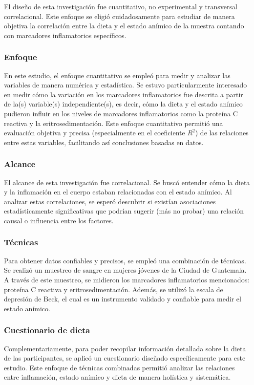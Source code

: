 \documentclass[man]{apa7}
\begin{document}
	El diseño de esta investigación fue cuantitativo, no experimental y
	transversal correlacional. Este enfoque se eligió cuidadosamente para
	estudiar de manera objetiva la correlación entre la dieta y el estado
	anímico de la muestra contando con marcadores inflamatorios
	específicos.\\

	\subsubsection{Enfoque} En este estudio, el enfoque cuantitativo se empleó para
	medir y analizar las variables de manera numérica y estadística. Se
	estuvo particularmente interesado en medir cómo la variación en los
	marcadores inflamatorios fue descrita a partir de la(s) variable(s)
	independiente(s), es decir, cómo la dieta y el estado anímico pudieron
	influir en los niveles de marcadores inflamatorios como la proteína C
	reactiva y la eritrosedimentación. Este enfoque cuantitativo permitió una
	evaluación objetiva y precisa (especialmente en el coeficiente
	\emph{$R^2$}) de las relaciones entre estas variables, facilitando así
	conclusiones basadas en datos.\\

	\subsubsection{Alcance}
	El alcance de esta investigación fue correlacional.
	Se buscó entender cómo la dieta y la inflamación en el cuerpo estaban relacionadas
	con el estado anímico. Al analizar estas correlaciones, se
	esperó descubrir si existían asociaciones estadísticamente significativas
	que podrían sugerir (más no probar) una relación causal o influencia
	entre los factores.

	\subsubsection{Técnicas}
	Para obtener datos confiables y precisos, se empleó una combinación de técnicas. Se realizó un muestreo de sangre en mujeres jóvenes de la Ciudad de Guatemala. A través de este muestreo, se midieron los marcadores inflamatorios mencionados: proteína C reactiva y eritrosedimentación. Además, se utilizó la escala de depresión de Beck, el cual es un instrumento validado y confiable para medir el estado anímico.

	\subsubsection{Cuestionario de dieta}
	Complementariamente, para poder recopilar información detallada sobre la dieta de las participantes, se aplicó un cuestionario diseñado específicamente para este estudio. Este enfoque de técnicas combinadas permitió analizar las relaciones entre inflamación, estado anímico y dieta de manera holística y sistemática.
\end{document}
